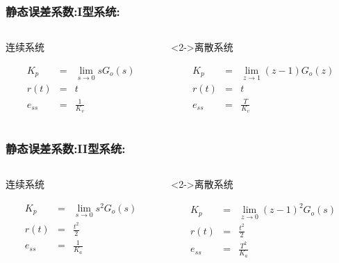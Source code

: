 \documentclass[table]{beamer}
\begin{document}
\begin{frame}
\frametitle{静态误差系数:I型系统:}
\label{sec-2-3}
\begin{columns}
\begin{column}{0.5\textwidth}
\begin{block}{连续系统}
\label{sec-2-3-1}

\begin{eqnarray*}
K_p &=& \lim_{s\rightarrow 0}sG_o(s)  \\
r(t)&=& t \\
e_{ss} &=& \frac{1}{K_v} 
\end{eqnarray*}
\end{block}
\end{column}
\begin{column}{0.5\textwidth}
\begin{block}<2->{离散系统}
\label{sec-2-3-2}

\begin{eqnarray*}
K_p &=& \lim_{z\rightarrow 1} (z-1)G_o(z)  \\
r(t)&=& t \\
e_{ss} &=& \frac{T}{K_v} 
\end{eqnarray*}
\end{block}
\end{column}
\end{columns}
\end{frame}
\begin{frame}
\frametitle{静态误差系数:II型系统:}
\label{sec-2-4}
\begin{columns}
\begin{column}{0.5\textwidth}
\begin{block}{连续系统}
\label{sec-2-4-1}

\begin{eqnarray*}
K_p &=& \lim_{s\rightarrow 0}s^2G_o(s)  \\
r(t)&=& \frac{t^2}{2} \\
e_{ss} &=& \frac{1}{K_a} 
\end{eqnarray*}
\end{block}
\end{column}
\begin{column}{0.5\textwidth}
\begin{block}<2->{离散系统}
\label{sec-2-4-2}

\begin{eqnarray*}
K_p &=& \lim_{z\rightarrow 0}(z-1)^2G_o(s)  \\
r(t)&=& \frac{t^2}{2} \\
e_{ss} &=& \frac{T^2}{K_a} 
\end{eqnarray*}
\end{block}
\end{column}
\end{columns}
\end{frame}
\end{document}

